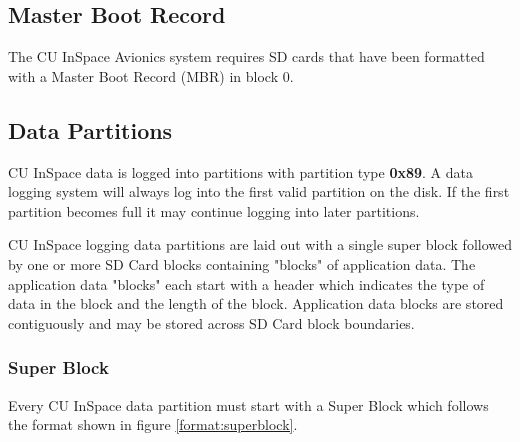 \subsection{Master Boot Record}

The CU InSpace Avionics system requires SD cards that have been formatted with a Master Boot Record (MBR) in block 0.

\subsection{Data Partitions}

CU InSpace data is logged into partitions with partition type \textbf{0x89}. A data logging system will always log into
the first valid partition on the disk. If the first partition becomes full it may continue logging into later
partitions.

CU InSpace logging data partitions are laid out with a single super block followed by one or more SD Card blocks
containing "blocks" of application data. The application data "blocks" each start with a header which indicates the
type of data in the block and the length of the block. Application data blocks are stored contiguously and may be
stored across SD Card block boundaries.

\subsubsection{Super Block}

Every CU InSpace data partition must start with a Super Block which follows the format shown in figure
\ref{format:superblock}.

